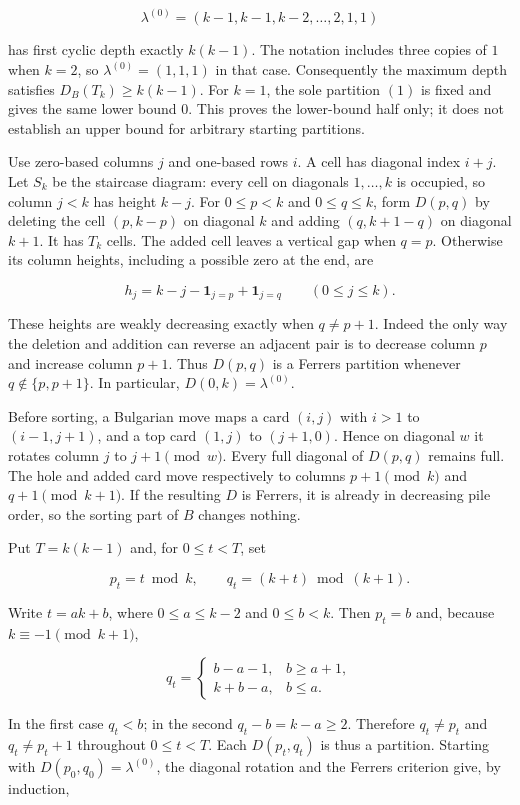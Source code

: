 \documentclass[11pt,a4paper]{article}
\begin{document}
\[
\lambda^{(0)}=(k-1,k-1,k-2,\ldots,2,1,1)
\]

has first cyclic depth exactly \(k(k-1)\). The notation includes three copies of \(1\) when \(k=2\), so \(\lambda^{(0)}=(1,1,1)\) in that case. Consequently the maximum depth satisfies \(D_B(T_k)\ge k(k-1)\). For \(k=1\), the sole partition \((1)\) is fixed and gives the same lower bound \(0\). This proves the lower-bound half only; it does not establish an upper bound for arbitrary starting partitions.

Use zero-based columns \(j\) and one-based rows \(i\). A cell has diagonal index \(i+j\). Let \(S_k\) be the staircase diagram: every cell on diagonals \(1,\ldots,k\) is occupied, so column \(j<k\) has height \(k-j\). For \(0\le p<k\) and \(0\le q\le k\), form \(D(p,q)\) by deleting the cell \((p,k-p)\) on diagonal \(k\) and adding \((q,k+1-q)\) on diagonal \(k+1\). It has \(T_k\) cells. The added cell leaves a vertical gap when \(q=p\). Otherwise its column heights, including a possible zero at the end, are

\[
h_j=k-j-\mathbf1_{j=p}+\mathbf1_{j=q}\qquad(0\le j\le k).
\]

These heights are weakly decreasing exactly when \(q\ne p+1\). Indeed the only way the deletion and addition can reverse an adjacent pair is to decrease column \(p\) and increase column \(p+1\). Thus \(D(p,q)\) is a Ferrers partition whenever \(q\notin\{p,p+1\}\). In particular, \(D(0,k)=\lambda^{(0)}\).

Before sorting, a Bulgarian move maps a card \((i,j)\) with \(i>1\) to \((i-1,j+1)\), and a top card \((1,j)\) to \((j+1,0)\). Hence on diagonal \(w\) it rotates column \(j\) to \(j+1\pmod w\). Every full diagonal of \(D(p,q)\) remains full. The hole and added card move respectively to columns \(p+1\pmod k\) and \(q+1\pmod{k+1}\). If the resulting \(D\) is Ferrers, it is already in decreasing pile order, so the sorting part of \(B\) changes nothing.

Put \(T=k(k-1)\) and, for \(0\le t<T\), set

\[
p_t=t\bmod k,\qquad q_t=(k+t)\bmod(k+1).
\]

Write \(t=ak+b\), where \(0\le a\le k-2\) and \(0\le b<k\). Then \(p_t=b\) and, because \(k\equiv-1\pmod{k+1}\),

\[
q_t=\begin{cases}
b-a-1,&b\ge a+1,\\
k+b-a,&b\le a.
\end{cases}
\]

In the first case \(q_t<b\); in the second \(q_t-b=k-a\ge2\). Therefore \(q_t\ne p_t\) and \(q_t\ne p_t+1\) throughout \(0\le t<T\). Each \(D(p_t,q_t)\) is thus a partition. Starting with \(D(p_0,q_0)=\lambda^{(0)}\), the diagonal rotation and the Ferrers criterion give, by induction,
\end{document}
